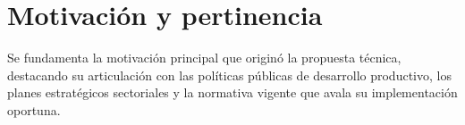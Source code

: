 \section{Motivación y pertinencia}
\label{sec:motivacion_pertinencia}

Se fundamenta la motivación principal que originó la propuesta técnica, destacando su articulación con las políticas públicas de desarrollo productivo, los planes estratégicos sectoriales y la normativa vigente que avala su implementación oportuna.
